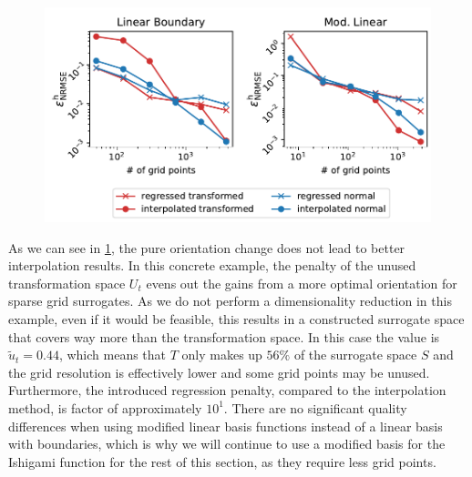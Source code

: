 \documentclass[
  a4paper,  %
  twoside,  %
  bibliography=totoc,
  headsepline,
  cleardoublepage=empty,
  parskip=half,
  draft=false
]{scrbook}
\begin{document}
\begin{mdframed}[style=style]
\begin{figure}[H]
\includegraphics[width=\textwidth]{graphics/ishigami_orientation}
\delimit

\label{fig:ishigami_errors}
\end{figure}
\end{mdframed}
%
As we can see in \cref{fig:ishigami_errors}, the pure orientation change does not lead to better interpolation results.
In this concrete example, the penalty of the unused transformation space $U_t$ evens out the gains from a more optimal orientation for sparse grid surrogates.
As we do not perform a dimensionality reduction in this example, even if it would be feasible, this results in a constructed surrogate space that covers way more than the transformation space.
In this case the value is $\tilde{u}_t=0.44$, which means that $T$ only makes up $56\%$ of the surrogate space $S$ and the grid resolution is effectively lower and some grid points may be unused.
Furthermore, the introduced regression penalty, compared to the interpolation method, is factor of approximately $10^1$.
There are no significant quality differences when using modified linear basis functions instead of a linear basis with boundaries, which is why we will continue to use a modified basis for the Ishigami function for the rest of this section, as they require less grid points.
\end{document}
